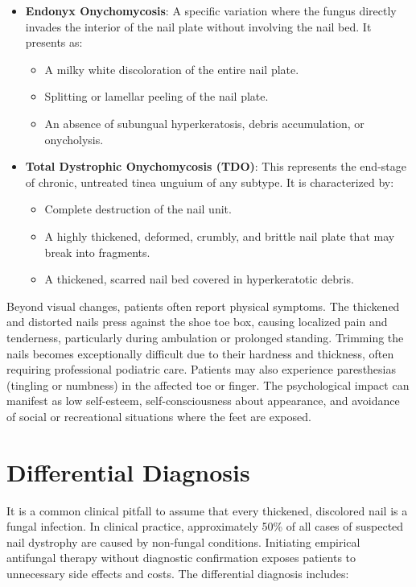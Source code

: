 \begin{itemize}
\begin{itemize}
        \item Progress of the discoloration distally as the nail grows.
        \item Significant clinical importance as a marker for systemic immunosuppression; its presence should prompt an evaluation for HIV infection or other immunodeficiencies.
    \end{itemize}
    \item \textbf{Endonyx Onychomycosis}: A specific variation where the fungus directly invades the interior of the nail plate without involving the nail bed. It presents as:
    \begin{itemize}
        \item A milky white discoloration of the entire nail plate.
        \item Splitting or lamellar peeling of the nail plate.
        \item An absence of subungual hyperkeratosis, debris accumulation, or onycholysis.
    \end{itemize}
    \item \textbf{Total Dystrophic Onychomycosis (TDO)}: This represents the end-stage of chronic, untreated tinea unguium of any subtype. It is characterized by:
    \begin{itemize}
        \item Complete destruction of the nail unit.
        \item A highly thickened, deformed, crumbly, and brittle nail plate that may break into fragments.
        \item A thickened, scarred nail bed covered in hyperkeratotic debris.
    \end{itemize}
\end{itemize}

Beyond visual changes, patients often report physical symptoms. The thickened and distorted nails press against the shoe toe box, causing localized pain and tenderness, particularly during ambulation or prolonged standing. Trimming the nails becomes exceptionally difficult due to their hardness and thickness, often requiring professional podiatric care. Patients may also experience paresthesias (tingling or numbness) in the affected toe or finger. The psychological impact can manifest as low self-esteem, self-consciousness about appearance, and avoidance of social or recreational situations where the feet are exposed.

\section*{Differential Diagnosis}
It is a common clinical pitfall to assume that every thickened, discolored nail is a fungal infection. In clinical practice, approximately 50\% of all cases of suspected nail dystrophy are caused by non-fungal conditions. Initiating empirical antifungal therapy without diagnostic confirmation exposes patients to unnecessary side effects and costs. The differential diagnosis includes:

